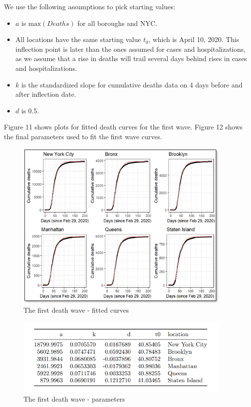 \documentclass[
]{article}
\providecommand{\tightlist}{%
  \setlength{\itemsep}{0pt}\setlength{\parskip}{0pt}}
\begin{document}
We use the following assumptions to pick starting values:

\begin{itemize}
\tightlist
\item
  \(a\) is \(\mbox{max}(Deaths)\) for all boroughs and NYC.
\item
  All locations have the same starting value \(t_0\), which is April 10,
  2020. This inflection point is later than the ones assumed for cases
  and hospitalizations, as we assume that a rise in deaths will trail
  several days behind rises in cases and hospitalizations.
\item
  \(k\) is the standardized slope for cumulative deaths data on 4 days
  before and after inflection date.
\item
  \(d\) is 0.5.
\end{itemize}

Figure 11 shows plots for fitted death curves for the first wave. Figure
12 shows the final parameters used to fit the first wave curves.

\begin{figure}
\centering
\includegraphics[width=4.16667in,height=\textheight]{plots/death_plots/wave1_plots.png}
\caption{The first death wave - fitted curves}
\end{figure}

\begin{figure}
\centering
\includegraphics[width=4.16667in,height=\textheight]{plots/death_plots/death_table_1.png}
\caption{The first death wave - parameters}
\end{figure}
\end{document}
